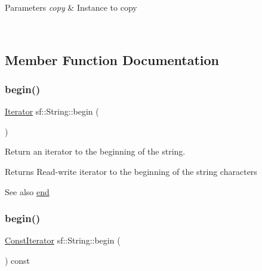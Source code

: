 \begin{DoxyParams}{Parameters}
{\em copy} & Instance to copy \begin{DoxyVerb}\end{DoxyVerb}
 \\
\hline
\end{DoxyParams}


\subsection{Member Function Documentation}
\mbox{\label{classsf_1_1_string_a8ec30ddc08e3a6bd11c99aed782f6dfe}} 
\subsubsection{\texorpdfstring{begin()}{begin()}\hspace{0.1cm}{\footnotesize\ttfamily [1/2]}}
{\footnotesize\ttfamily \mbox{\hyperlink{classsf_1_1_string_ac90f2b7b28f703020f8d027e98806235}{Iterator}} sf\+::\+String\+::begin (\begin{DoxyParamCaption}{ }\end{DoxyParamCaption})}



Return an iterator to the beginning of the string. 

\begin{DoxyReturn}{Returns}
Read-\/write iterator to the beginning of the string characters
\end{DoxyReturn}
\begin{DoxySeeAlso}{See also}
\mbox{\hyperlink{classsf_1_1_string_ac823012f39cb6f61100418876e99d53b}{end}} \begin{DoxyVerb}\end{DoxyVerb}
 
\end{DoxySeeAlso}
\mbox{\label{classsf_1_1_string_a0e4755d6b4d51de7c3dc2e984b79f95d}} 
\subsubsection{\texorpdfstring{begin()}{begin()}\hspace{0.1cm}{\footnotesize\ttfamily [2/2]}}
{\footnotesize\ttfamily \mbox{\hyperlink{classsf_1_1_string_a8e18efc2e8464f6eb82818902d527efa}{Const\+Iterator}} sf\+::\+String\+::begin (\begin{DoxyParamCaption}{ }\end{DoxyParamCaption}) const}



